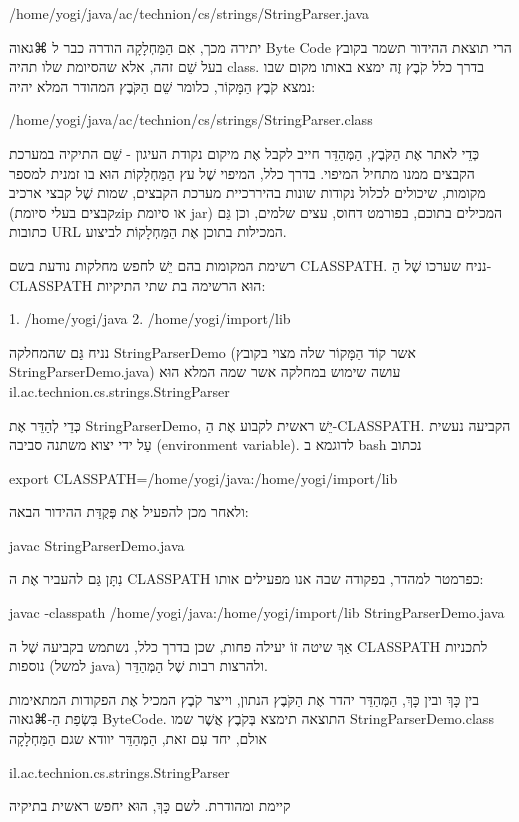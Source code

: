 /home/yogi/java/ac/technion/cs/strings/StringParser.java

יתירה מכך, אִם הַמַּחְלָקָה הודרה כבר ל ⌘גאוה Byte Code הרי תוצאת ההידור תשמר
בקובץ בעל שֵׁם זהה, אלא שהסיומת שלו תהיה class. בדרך כלל קֹבֶץ זֶה ימצא באותו
מקום שבו נמצא קֹבֶץ הַמָּקוֹר, כלומר שֵׁם הַקֹּבֶץ המהודר המלא יהיה:

/home/yogi/java/ac/technion/cs/strings/StringParser.class

כְּדֵי לאתר אֶת הַקֹּבֶץ, הַמְּהַדֵּר חייב לקבל אֶת מיקום נקודת העיגון - שֵׁם
התיקיה במערכת הקבצים ממנו מתחיל המיפוי. בדרך כלל, המיפוי שֶׁל עץ הַמַּחְלָקוֹת
הוּא בו זמנית למספר מקומות, שיכולים לכלול נקודות שונות בהיררכיית מערכת הקבצים,
שמות שֶׁל קבצי ארכיב (קבצים בעלי סיומתzip או סיומת jar) המכילים בתוכם, בפורמט
דחוס, עצים שלמים, וכן גַּם כתובות URL המכילות בתוכן אֶת הַמַּחְלָקוֹת לביצוע.

רשימת המקומות בהם יֵשׁ לחפש מחלקות נודעת בשם CLASSPATH. נניח שערכו שֶׁל
הַ-CLASSPATH הוּא הרשימה בת שתי התיקיות:

1. /home/yogi/java
2. /home/yogi/import/lib

נניח גַּם שהמחלקה StringParserDemo (אשר קוֹד הַמָּקוֹר שלה מצוי בקובץ
StringParserDemo.java) עושה שימוש במחלקה אשר שמה המלא הוּא
il.ac.technion.cs.strings.StringParser

כְּדֵי לְהַדֵּר אֶת StringParserDemo,  יֵשׁ ראשית לקבוע אֶת הַ-CLASSPATH. הקביעה
נעשית עַל ידי יצוא משתנה סביבה (environment variable). לדוגמא ב bash נכתוב

export CLASSPATH=/home/yogi/java:/home/yogi/import/lib


ולאחר מכן להפעיל אֶת פְּקֻדַּת ההידור הבאה:

javac StringParserDemo.java

נִתָּן גַּם להעביר אֶת ה CLASSPATH כפרמטר למהדר, בפקודה שבה אנו מפעילים אותו:

javac -classpath /home/yogi/java:/home/yogi/import/lib StringParserDemo.java

אַךְ שיטה זוֹ יעילה פחות, שכן בדרך כלל, נשתמש בקביעה שֶׁל ה CLASSPATH לתכניות
נוספות (למשל java) ולהרצות רבות שֶׁל הַמְּהַדֵּר.

בין כָּךְ ובין כָּךְ, הַמְּהַדֵּר יהדר אֶת הַקֹּבֶץ הנתון, וייצר קֹבֶץ המכיל אֶת
הפקודות המתאימות בִּשְׂפַת הַ-⌘גאוה ByteCode. התוצאה תימצא בְּקֹבֶץ אֲשֶׁר שמו
StringParserDemo.class אולם, יחד עִם זאת, הַמְּהַדֵּר יוודא שגם הַמַּחְלָקָה

 il.ac.technion.cs.strings.StringParser

קיימת ומהודרת. לשם כָּךְ, הוּא יחפש ראשית בתיקיה

